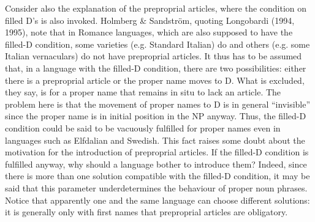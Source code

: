 Consider also the explanation of the preproprial articles, where the condition on filled D’s is also invoked. Holmberg \& Sandström, quoting Longobardi (1994, 1995), note that in Romance languages, which are also supposed to have the filled-D condition, some varieties (e.g. Standard Italian) do and others (e.g. some Italian vernaculars) do not have preproprial articles. It thus has to be assumed that, in a language with the filled-D condition, there are two possibilities: either there is a preproprial article or the proper name moves to D. What is excluded, they say, is for a proper name that remains in situ to lack an article. The problem here is that the movement of proper names to D is in general “invisible” since the proper name is in initial position in the NP anyway. Thus, the filled-D condition could be said to be vacuously fulfilled for proper names even in languages such as Elfdalian and Swedish. This fact raises some doubt about the motivation for the introduction of preproprial articles. If the filled-D condition is fulfilled anyway, why should a language bother to introduce them? Indeed, since there is more than one solution compatible with the filled-D condition, it may be said that this parameter underdetermines the behaviour of proper noun phrases. Notice that apparently one and the same language can choose different solutions: it is generally only with first names that preproprial articles are obligatory. 


